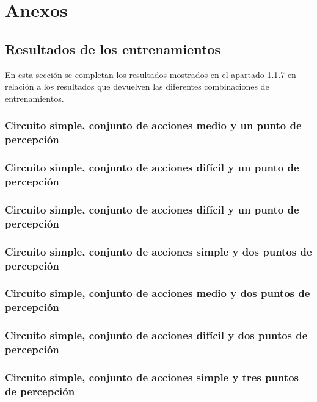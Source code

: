 \chapter{Anexos}\label{anexos}

\section{Resultados de los entrenamientos}\label{anexo-resultados-entrenamientos}

En esta sección se completan los resultados mostrados en el apartado \ref{} en relación a los resultados que devuelven las diferentes combinaciones de entrenamientos.

\subsection{Circuito simple, conjunto de acciones medio y un punto de percepción}

\subsection{Circuito simple, conjunto de acciones difícil y un punto de percepción}

\subsection{Circuito simple, conjunto de acciones difícil y un punto de percepción}

\subsection{Circuito simple, conjunto de acciones simple y dos puntos de percepción}

\subsection{Circuito simple, conjunto de acciones medio y dos puntos de percepción}

\subsection{Circuito simple, conjunto de acciones difícil y dos puntos de percepción}

\subsection{Circuito simple, conjunto de acciones simple y tres puntos de percepción}

